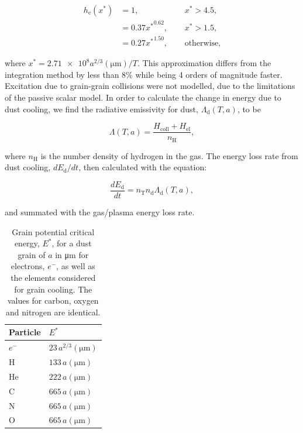 \documentclass[fleqn,usenatbib]{mnras}
\newcommand{\rms}[1]{\ensuremath{_{\text{#1}}}}
\begin{document}
\begin{equation}
  \begin{alignedat}{3}
    h\rms{e}(x^*) & = 1 ,                && ~~ x^* > 4.5, \\
             & = 0.37{x^*}^{0.62} , && ~~ x^* > 1.5 , \\
             & = 0.27{x^*}^{1.50} , && ~~ \text{otherwise,}
  \end{alignedat}
\end{equation}

\noindent
where $x^* = \num{2.71e8} a^{2/3} (\si{\micro\metre})/T$.
This approximation differs from the integration method by less than 8\% while being 4 orders of magnitude faster.
Excitation due to grain-grain collisions were not modelled, due to the limitations of the passive scalar model.
In order to calculate the change in energy due to dust cooling, we find the radiative emissivity for dust, $\Lambda\rms{d}(T,a)$, to be

\begin{equation}
  \Lambda(T,a) = \frac{H\rms{coll} + H\rms{el}}{n\rms{H}} ,
\end{equation}

\noindent
where $n\rms{H}$ is the number density of hydrogen in the gas.
The energy loss rate from dust cooling, $dE\rms{d}/dt$, then calculated with the equation:

\begin{equation}
  \frac{dE\rms{d}}{dt} = n\rms{T} n\rms{d} \Lambda\rms{d} (T,a) , 
\end{equation}

\noindent
and summated with the gas/plasma energy loss rate.

\begin{table}
  \centering
  \begin{tabular}{ll}
    \hline
    Particle & $E^*$ \\
    \hline
    $e^-$ & $23 \, a^{2/3}(\si{\micro\metre})$ \\
    H     & $133 \, a(\si{\micro\metre})$ \\
    He    & $222 \, a(\si{\micro\metre})$ \\
    C     & $665 \, a(\si{\micro\metre})$ \\
    N     & $665 \, a(\si{\micro\metre})$ \\
    O     & $665 \, a(\si{\micro\metre})$ \\
    \hline
  \end{tabular}
  \caption[Grain potential critical energy]{Grain potential critical energy, $E^*$, for a dust grain of $a$ in \si{\micro\metre} for electrons, $e^-$, as well as the elements considered for grain cooling. The values for carbon, oxygen and nitrogen are identical.}
  \label{tab:p2-criticalenergy}
\end{table}
\end{document}
